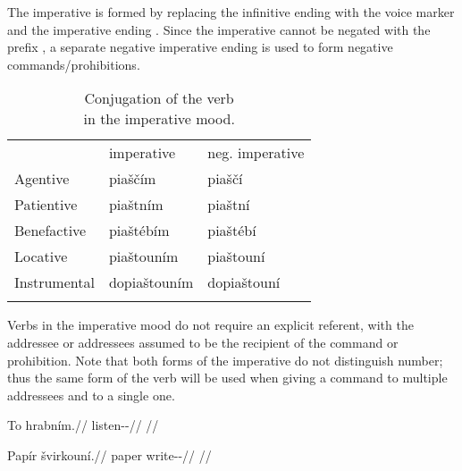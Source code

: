 The imperative is formed by replacing the infinitive ending  with the
voice marker and the imperative ending . Since the
imperative cannot be negated with the prefix ,
a separate negative imperative ending  is used to form negative
commands/prohibitions.

\begin{table}
\sffamily\footnotesize
	\caption{Conjugation of the verb \\ in the imperative mood.}
	\label{tbl:imperative}
\medskip
    \begin{tabu}to 0.7
         \toprule \addlinespace
         &{\sc imperative}&{\sc neg. imperative}  \\ \addlinespace
         \midrule \addlinespace

         Agentive &
         {piaščím} &
         {piaščí}\\ \addlinespace

         Patientive &
         {piaštním} &
         {piaštní}\\ \addlinespace

         Benefactive &
         {piaštébím} &
         {piaštébí}\\ \addlinespace

         Locative &
         {piaštouním} &
         {piaštouní}\\ \addlinespace

         Instrumental &
         {dopiaštouním} &
         {dopiaštouní}\\ \addlinespace

         \bottomrule
    \end{tabu}

\end{table}

Verbs in the imperative mood do not require an explicit referent, with the
addressee or addressees assumed to be the recipient of the command or
prohibition. Note that both forms of the imperative do not distinguish number;
thus the same form of the verb will be used when giving a command to multiple
addressees and to a single one.

\pex
\begingl
    \gla To hrabním.//
    \glb \Dem{} listen-\Pv{}-\Imp{}//
    \glft {}//
\endgl
\xe

\pex
\begingl
    \gla Papír švirkouní.//
    \glb paper write-\Lv{}-\N{}\Imp{}//
    \glft {}//
\endgl
\xe


